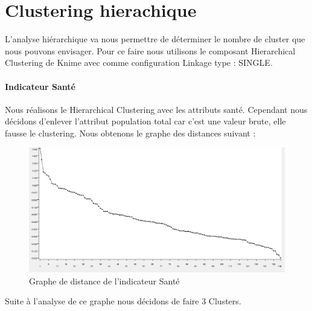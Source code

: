 \section{Clustering hierachique}
L'analyse hiérarchique va nous permettre de déterminer le nombre de cluster que nous pouvons envisager. Pour ce faire nous utilisons le composant Hierarchical Clustering de Knime avec comme configuration Linkage type : SINGLE.

\paragraph{Indicateur Santé}
Nous réalisons le Hierarchical Clustering avec les attributs santé. Cependant nous décidons d'enlever l'attribut population total car c'est une valeur brute, elle fausse le clustering. Nous obtenons le graphe des distances suivant : 

\begin{figure}[H]
	\begin{center}
		\includegraphics[scale=0.5]{Image/DistanceSanteNoMissing2}
		\caption{Graphe de distance de l'indicateur Santé \jeuc}
	\end{center}
\end{figure}

Suite à l'analyse de ce graphe nous décidons de faire 3 Clusters.

